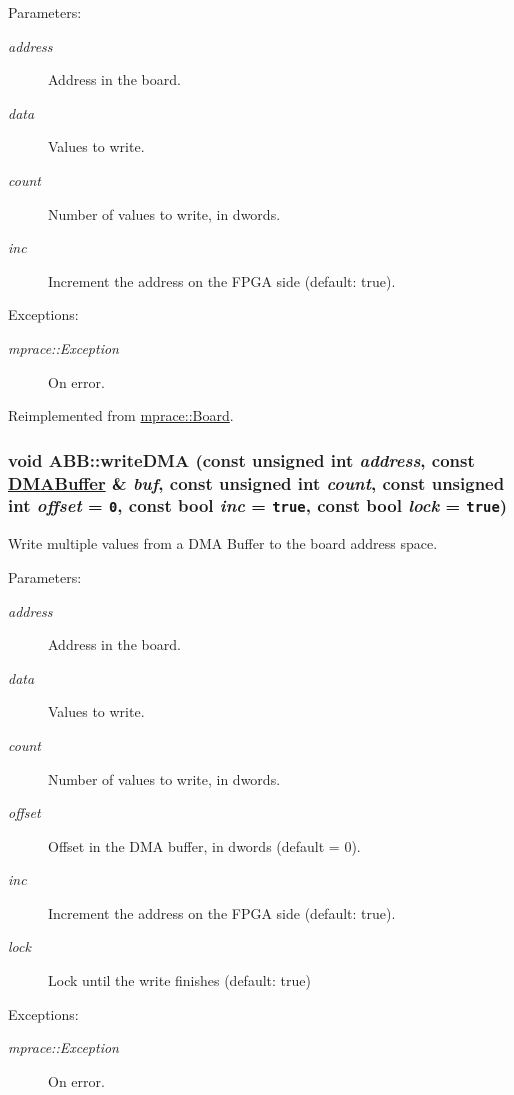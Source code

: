 \begin{Desc}
\item[Parameters:]
\begin{description}
\item[{\em address}]Address in the board. \item[{\em data}]Values to write. \item[{\em count}]Number of values to write, in dwords. \item[{\em inc}]Increment the address on the FPGA side (default: true). \end{description}
\end{Desc}
\begin{Desc}
\item[Exceptions:]
\begin{description}
\item[{\em mprace::Exception}]On error.\end{description}
\end{Desc}


Reimplemented from \hyperlink{classmprace_1_1Board_a5}{mprace::Board}.\hypertarget{classmprace_1_1ABB_a8}{
\subsubsection[writeDMA]{\setlength{\rightskip}{0pt plus 5cm}void ABB::write\-DMA (const unsigned int {\em address}, const \hyperlink{classmprace_1_1DMABuffer}{DMABuffer} \& {\em buf}, const unsigned int {\em count}, const unsigned int {\em offset} = {\tt 0}, const bool {\em inc} = {\tt true}, const bool {\em lock} = {\tt true})}}
\label{classmprace_1_1ABB_a8}


Write multiple values from a DMA Buffer to the board address space. 

\begin{Desc}
\item[Parameters:]
\begin{description}
\item[{\em address}]Address in the board. \item[{\em data}]Values to write. \item[{\em count}]Number of values to write, in dwords. \item[{\em offset}]Offset in the DMA buffer, in dwords (default = 0). \item[{\em inc}]Increment the address on the FPGA side (default: true). \item[{\em lock}]Lock until the write finishes (default: true) \end{description}
\end{Desc}
\begin{Desc}
\item[Exceptions:]
\begin{description}
\item[{\em mprace::Exception}]On error.\end{description}
\end{Desc}


